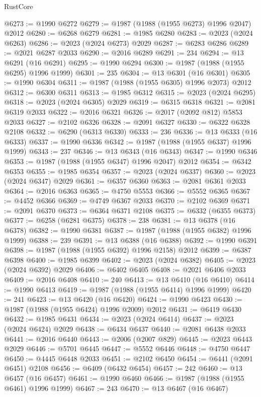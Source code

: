 \begin{lexlean}{RustCore}
\begin{coremodule}
@6273 := @1990 @6272
@6279 := @1987 (@1988 (@1955 @6273) @1996 @2047) @2012
@6280 := @6268 @6279
@6281 := @1985 @6280
@6283 := @2023 (@2024 @6263)
@6286 := @2023 (@2024 @6273) @2029
@6287 := @6283 @6286
@6289 := @2021 @6287 @2033
@6290 := @2016 @6289
@6291 := 234
@6294 := @13 @6291 (@16 @6291)
@6295 := @1990 @6294
@6300 := @1987 (@1988 (@1955 @6295) @1996 @1999)
@6301 := 235
@6304 := @13 @6301 (@16 @6301)
@6305 := @1990 @6304
@6311 := @1987 (@1988 (@1955 @6305) @1996 @2073) @2012
@6312 := @6300 @6311
@6313 := @1985 @6312
@6315 := @2023 (@2024 @6295)
@6318 := @2023 (@2024 @6305) @2029
@6319 := @6315 @6318
@6321 := @2081 @6319 @2033
@6322 := @2016 @6321
@6326 := @2017 (@2092 @812) @5853 @2033
@6327 := @2102 @6326
@6328 := @2091 @6327
@6330 := @6322 @6328 @2108
@6332 := @6290 (@6313 @6330)
@6333 := 236
@6336 := @13 @6333 (@16 @6333)
@6337 := @1990 @6336
@6342 := @1987 (@1988 (@1955 @6337) @1996 @1999)
@6343 := 237
@6346 := @13 @6343 (@16 @6343)
@6347 := @1990 @6346
@6353 := @1987 (@1988 (@1955 @6347) @1996 @2047) @2012
@6354 := @6342 @6353
@6355 := @1985 @6354
@6357 := @2023 (@2024 @6337)
@6360 := @2023 (@2024 @6347) @2029
@6361 := @6357 @6360
@6363 := @2081 @6361 @2033
@6364 := @2016 @6363
@6365 := @4750 @5553
@6366 := @5552 @6365
@6367 := @4452 @6366
@6369 := @4749 @6367 @2033
@6370 := @2102 @6369
@6371 := @2091 @6370
@6373 := @6364 @6371 @2108
@6375 := @6332 (@6355 @6373)
@6377 := @6258 (@6281 @6375)
@6378 := 238
@6381 := @13 @6378 (@16 @6378)
@6382 := @1990 @6381
@6387 := @1987 (@1988 (@1955 @6382) @1996 @1999)
@6388 := 239
@6391 := @13 @6388 (@16 @6388)
@6392 := @1990 @6391
@6398 := @1987 (@1988 (@1955 @6392) @1996 @2158) @2012
@6399 := @6387 @6398
@6400 := @1985 @6399
@6402 := @2023 (@2024 @6382)
@6405 := @2023 (@2024 @6392) @2029
@6406 := @6402 @6405
@6408 := @2021 @6406 @2033
@6409 := @2016 @6408
@6410 := 240
@6413 := @13 @6410 (@16 @6410)
@6414 := @1990 @6413
@6419 := @1987 (@1988 (@1955 @6414) @1996 @1999)
@6420 := 241
@6423 := @13 @6420 (@16 @6420)
@6424 := @1990 @6423
@6430 := @1987 (@1988 (@1955 @6424) @1996 @2009) @2012
@6431 := @6419 @6430
@6432 := @1985 @6431
@6434 := @2023 (@2024 @6414)
@6437 := @2023 (@2024 @6424) @2029
@6438 := @6434 @6437
@6440 := @2081 @6438 @2033
@6441 := @2016 @6440
@6443 := @2006 (@2007 @829)
@6445 := @2023 @6443 @2029
@6446 := @5701 @6445
@6447 := @5552 @6446
@6448 := @4750 @6447
@6450 := @4445 @6448 @2033
@6451 := @2102 @6450
@6454 := @6441 (@2091 @6451) @2108
@6456 := @6409 (@6432 @6454)
@6457 := 242
@6460 := @13 @6457 (@16 @6457)
@6461 := @1990 @6460
@6466 := @1987 (@1988 (@1955 @6461) @1996 @1999)
@6467 := 243
@6470 := @13 @6467 (@16 @6467)

\end{coremodule}
\end{lexlean}
